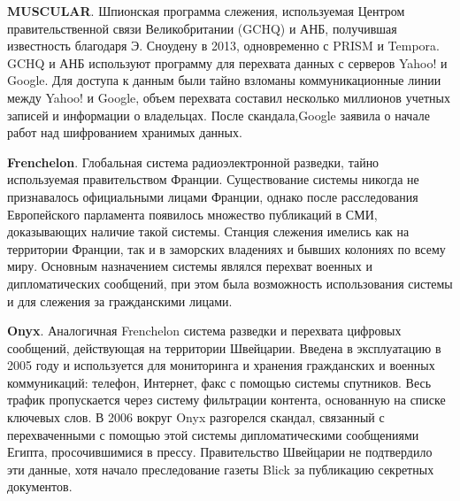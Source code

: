 	
	\textbf{MUSCULAR}.    Шпионская  программа слежения, используемая Центром правительственной связи Великобритании (GCHQ) и АНБ, получившая известность благодаря Э. Сноудену в 2013, одновременно с PRISM и Tempora. GCHQ и АНБ используют программу для перехвата данных с серверов Yahoo! и Google. Для доступа к данным были тайно взломаны коммуникационные линии между Yahoo! и Google, объем перехвата составил  несколько миллионов учетных записей и информации о владельцах.  После скандала,Google заявила о начале работ над шифрованием хранимых данных. 	%
	
	\textbf{Frenchelon}. Глобальная система радиоэлектронной разведки, тайно используемая правительством Франции. Существование системы никогда не признавалось официальными лицами Франции, однако после расследования Европейского парламента появилось множество публикаций в СМИ, доказывающих наличие такой системы. %
	Станция слежения имелись как на территории Франции, так и в заморских владениях и бывших колониях по всему миру. Основным назначением системы являлся перехват военных и дипломатических сообщений, при этом была возможность использования системы и для слежения за гражданскими лицами. 
	
	\textbf{Onyx}. Аналогичная Frenchelon система разведки и перехвата цифровых сообщений, действующая на территории Швейцарии. Введена в эксплуатацию в 2005 году	и используется для мониторинга и хранения гражданских и военных коммуникаций: телефон, Интернет, факс с помощью системы спутников. Весь трафик пропускается через систему фильтрации контента, основанную на списке ключевых слов. В 2006 вокруг Onyx разгорелся скандал, связанный с перехваченными с помощью этой системы дипломатическими сообщениями Египта, просочившимися в прессу. Правительство Швейцарии  не подтвердило эти данные, хотя начало преследование газеты  Blick за публикацию секретных документов. %
	\\
	
